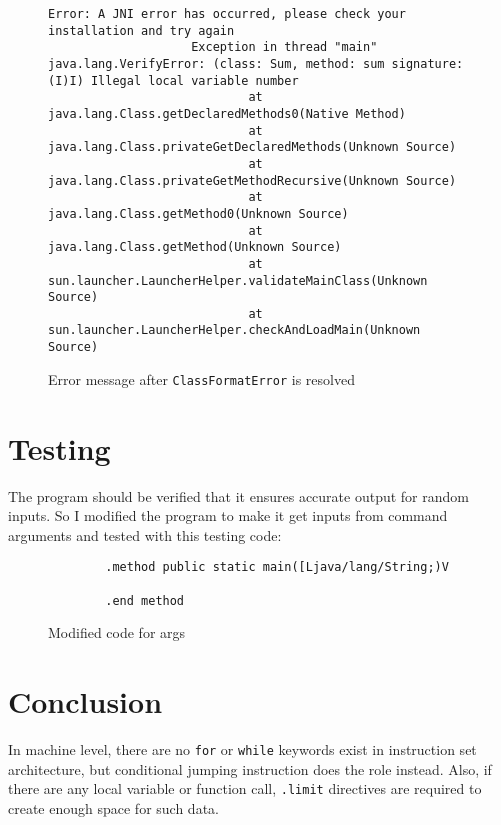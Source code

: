 \documentclass[a4paper, 12pt]{article}
\begin{document}
            \begin{figure}[H]
                \begin{lstlisting}[gobble=20]
                    Error: A JNI error has occurred, please check your installation and try again
                    Exception in thread "main" java.lang.VerifyError: (class: Sum, method: sum signature: (I)I) Illegal local variable number
                            at java.lang.Class.getDeclaredMethods0(Native Method)
                            at java.lang.Class.privateGetDeclaredMethods(Unknown Source)
                            at java.lang.Class.privateGetMethodRecursive(Unknown Source)
                            at java.lang.Class.getMethod0(Unknown Source)
                            at java.lang.Class.getMethod(Unknown Source)
                            at sun.launcher.LauncherHelper.validateMainClass(Unknown Source)
                            at sun.launcher.LauncherHelper.checkAndLoadMain(Unknown Source)
                \end{lstlisting}
        
                \centering        
                \caption{Error message after \texttt{ClassFormatError} is resolved}
            \end{figure}
    \section{Testing}
    The program should be verified that it ensures accurate output for random inputs. So I modified the program to make it get inputs from command arguments and tested with this testing code:
    \begin{figure}[H]
        \begin{lstlisting}
        .method public static main([Ljava/lang/String;)V
            
        .end method
        \end{lstlisting}

        \centering        
        \caption{Modified code for args}
    \end{figure}

    \section{Conclusion}
    In machine level, there are no \texttt{for} or \texttt{while} keywords exist in instruction set architecture, but conditional jumping instruction does the role instead. Also, if there are any local variable or function call, \texttt{.limit} directives are required to create enough space for such data.
\end{document}
